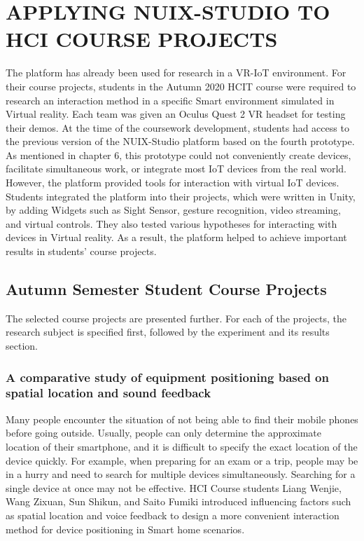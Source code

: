 
\chapter{\MakeUppercase{Applying NUIX-Studio to HCI Course Projects}}

The platform has already been used for research in a VR-IoT environment.
For their course projects, students in the Autumn 2020 HCIT course were required to research an interaction method in a specific Smart environment simulated in Virtual reality. Each team was given an Oculus Quest 2 VR headset for testing their demos. At the time of the coursework development, students had access to the previous version of the NUIX-Studio platform based on the fourth prototype. As mentioned in chapter 6, this prototype could not conveniently create devices, facilitate simultaneous work, or integrate most IoT devices from the real world. However, the platform provided tools for interaction with virtual IoT devices. Students integrated the platform into their projects, which were written in Unity, by adding Widgets such as Sight Sensor, gesture recognition, video streaming, and virtual controls. They also tested various hypotheses for interacting with devices in Virtual reality. As a result, the platform helped to achieve important results in students' course projects. 

\section{Autumn Semester Student Course Projects}

The selected course projects are presented further. For each of the projects, the research subject is specified first, followed by the experiment and its results section.


\subsection{A comparative study of equipment positioning based on spatial location and sound feedback}

Many people encounter the situation of not being able to find their mobile phones before going outside. Usually, people can only determine the approximate location of their smartphone, and it is difficult to specify the exact location of the device quickly. For example, when preparing for an exam or a trip, people may be in a hurry and need to search for multiple devices simultaneously. Searching for a single device at once may not be effective. HCI Course students Liang Wenjie, Wang Zixuan, Sun Shikun, and Saito Fumiki introduced influencing factors such as spatial location and voice feedback to design a more convenient interaction method for device positioning in Smart home scenarios. 


